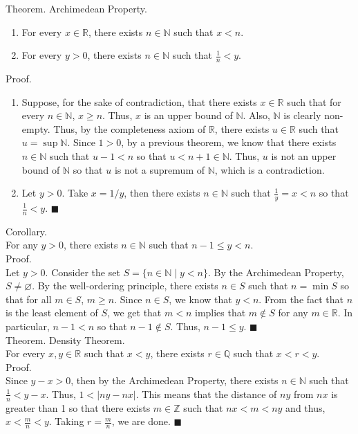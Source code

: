 \documentclass[twocolumn]{article}
\newcommand{\qed}{$\blacksquare$}
\newcommand{\br}{\vspace{\baselineskip}}
\let\emptyset\varnothing
\newcommand{\naturals}{\mathbb{N}}
\newcommand{\integers}{\mathbb{Z}}
\newcommand{\rationals}{\mathbb{Q}}
\newcommand{\reals}{\mathbb{R}}
\begin{document}
Theorem. Archimedean Property.
\begin{enumerate}
	\item
		For every $x \in \reals$, there exists $n \in \naturals$ such that $x < n$.
	\item
		For every $y > 0$, there exists $n \in \naturals$ such that $\frac{1}{n} < y$.
\end{enumerate}
Proof.
\begin{enumerate}
	\item
		Suppose, for the sake of contradiction, that there exists $x \in \reals$ such that for every $n \in \naturals$, $x \geq n$. Thus, $x$ is an upper bound of $\naturals$. Also, $\naturals$ is clearly non-empty. Thus, by the completeness axiom of $\reals$, there exists $u \in \reals$ such that $u = \sup \naturals$. Since $1 > 0$, by a previous theorem, we know that there exists $n \in \naturals$ such that $u - 1 < n$ so that $u < n + 1 \in \naturals$. Thus, $u$ is not an upper bound of $\naturals$ so that $u$ is not a supremum of $\naturals$, which is a contradiction.
	\item
		Let $y > 0$. Take $x = 1 / y$, then there exists $n \in \naturals$ such that $\frac{1}{y} = x < n$ so that $\frac{1}{n} < y$. \qed
\end{enumerate} \br

Corollary. \\
For any $y > 0$, there exists $n \in \naturals$ such that $n - 1 \leq y < n$. \\
Proof. \\
Let $y > 0$. Consider the set $S = \{n \in \naturals \mid y < n \}$. By the Archimedean Property, $S \neq \emptyset$. By the well-ordering principle, there exists $n \in S$ such that $n = \min S$ so that for all $m \in S$, $m \geq n$. Since $n \in S$, we know that $y < n$. From the fact that $n$ is the least element of $S$, we get that $m < n$ implies that $m \not\in S$ for any $m \in \reals$. In particular, $n - 1 < n$ so that $n - 1 \not\in S$. Thus, $n - 1 \leq y$. \qed \\

Theorem. Density Theorem. \\
For every $x, y \in \reals$ such that $x < y$, there exists $r \in \rationals$ such that $x < r < y$. \\
Proof. \\
Since $y - x > 0$, then by the Archimedean Property, there exists $n \in \naturals$ such that $\frac{1}{n} < y - x$. Thus, $1 < |ny - nx|$. This means that the distance of $ny$ from $nx$ is greater than 1 so that there exists $m \in \integers$ such that $nx < m < ny$ and thus, $x < \frac{m}{n} < y$. Taking $r = \frac{m}{n}$, we are done. \qed \\
\end{document}

